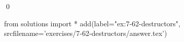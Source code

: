 
\begin{ex}
  \label{ex:7-62-destructors}
  
  \qed
\end{ex}
\begin{python0}
from solutions import *
add(label="ex:7-62-destructors",
    srcfilename='exercises/7-62-destructors/answer.tex')
\end{python0}
